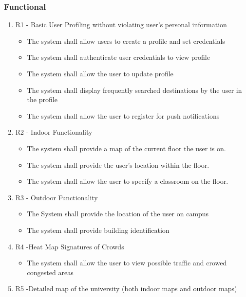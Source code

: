 \documentclass[a4paper, 12pt, one column, aas_macros]{article}
\begin{document}
\subsubsection{Functional}
\begin{enumerate}
\item R1 - Basic User Profiling without violating user’s personal information

\begin{itemize}
\item The system shall allow users to create a profile and set credentials
\item The system shall authenticate user credentials to view profile
\item The system shall allow the user to update profile
\item The system shall display frequently searched destinations by the user in the profile
\item The system shall allow the user to register for push notifications
\end{itemize}

\item R2 - Indoor Functionality
\begin{itemize}
\item The system shall provide a map of the current floor the user is on.
\item The system shall provide the user's location within the floor.
\item The system shall allow the user to specify a classroom on the floor.
\end{itemize}

\item R3 - Outdoor Functionality
\begin{itemize}
\item The System shall provide the location of the user on campus
\item The system shall provide building identification
\end{itemize}

\item R4 -Heat Map Signatures of Crowds

\begin{itemize}
\item The system shall allow the user to view possible traffic and crowed congested areas
\end{itemize}
 

\item R5 -Detailed map of the university (both indoor maps and outdoor maps)


\end{enumerate}
\end{document}
